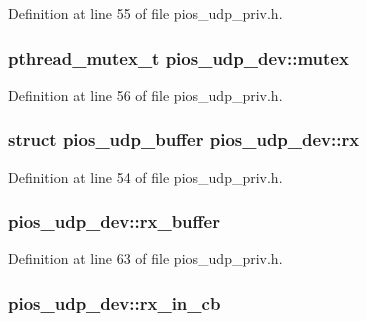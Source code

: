 Definition at line 55 of file pios\-\_\-udp\-\_\-priv.\-h.

\hypertarget{structpios__udp__dev_ad95bd14436ecf5291f717b5e1d02ceea}{
\subsubsection[{mutex}]{\setlength{\rightskip}{0pt plus 5cm}pthread\-\_\-mutex\-\_\-t pios\-\_\-udp\-\_\-dev\-::mutex}}\label{structpios__udp__dev_ad95bd14436ecf5291f717b5e1d02ceea}


Definition at line 56 of file pios\-\_\-udp\-\_\-priv.\-h.

\hypertarget{structpios__udp__dev_a4e728b107c67f2b1d2e5e1276187446f}{
\subsubsection[{rx}]{\setlength{\rightskip}{0pt plus 5cm}struct {\bf pios\-\_\-udp\-\_\-buffer} pios\-\_\-udp\-\_\-dev\-::rx}}\label{structpios__udp__dev_a4e728b107c67f2b1d2e5e1276187446f}


Definition at line 54 of file pios\-\_\-udp\-\_\-priv.\-h.

\hypertarget{structpios__udp__dev_a65502570ba375c9621f1659b8d792a04}{
\subsubsection[{rx\-\_\-buffer}]{ pios\-\_\-udp\-\_\-dev\-::rx\-\_\-buffer}}\label{structpios__udp__dev_a65502570ba375c9621f1659b8d792a04}


Definition at line 63 of file pios\-\_\-udp\-\_\-priv.\-h.

\hypertarget{structpios__udp__dev_ae0e9d717bbca5d5a4a741632fce620f4}{
\subsubsection[{rx\-\_\-in\-\_\-cb}]{ pios\-\_\-udp\-\_\-dev\-::rx\-\_\-in\-\_\-cb}}\label{structpios__udp__dev_ae0e9d717bbca5d5a4a741632fce620f4}


